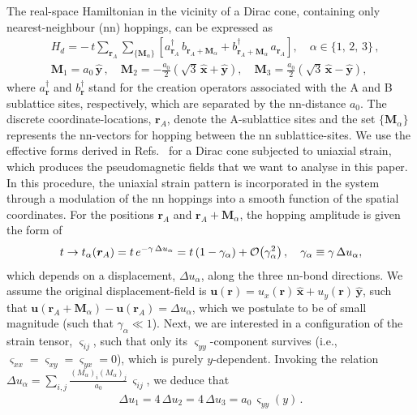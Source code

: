 \documentclass[aps,prb, onecolumn, nofootinbib, citeautoscript,10pt]{revtex4-2}
\newcommand{\bs}[1]{\boldsymbol{#1}}
\def \nn{\nonumber \\}
\begin{document}
The real-space Hamiltonian in the vicinity of a Dirac cone, containing only nearest-neighbour (nn) hoppings, can be expressed as
\begin{align}
\label{eqnn}
& H_d = -\, t \sum_{\bs r_A} \sum \limits_{ \lbrace \bs M_\alpha \rbrace } \left[ 
a_{\bs r_A}^\dagger \, b_{\bs r_A + \bs M_\alpha} + b_{\bs r_A + \bs M_\alpha }^\dagger \, a_{\bs r_A}
\right ], \quad \alpha \in \lbrace 1, \,2 ,\, 3 \rbrace \,,\nn
& \bs M_1 = a_0 \, \bs{\hat y}\,, \quad \bs M_2 = - \frac{a_0}{2} \left(\sqrt 3 \,\bs{\hat x} + \bs{\hat y}\right),
\quad \bs M_3 =  \frac{a_0}{2} \left(\sqrt 3 \,\bs{\hat x} - \bs{\hat y}\right),
\end{align}
where $a^\dagger_{\bs r}$ and $b ^\dagger _{\bs r}$ stand for the creation operators associated with the A and B sublattice sites, respectively, which are separated by the nn-distance $a_0$. The discrete coordinate-locations, $\bs r_A$, denote the A-sublattice sites and the set $\lbrace \bs M_\alpha \rbrace$ represents the nn-vectors for hopping between the nn sublattice-sites. We use the effective forms derived in Refs.~\cite{neto-strain-graphene, strained-dirac-franz} for a Dirac cone subjected to uniaxial strain, which produces the pseudomagnetic fields that we want to analyse in this paper. In this procedure, the uniaxial strain pattern is incorporated in the system through a modulation of the nn hoppings into a  smooth function of the spatial coordinates. For the positions $\bs r_A $ and $\bs r_A + \bs M_\alpha $, the hopping amplitude is given the form of 
\begin{align}
t \rightarrow t_{\alpha}(\bs r_A) 
 = t\, e^{-\gamma \,\Delta u_\alpha }
=  t  \left ( 1 -  \gamma_\alpha \right)
 + \order{ \gamma _\alpha^2 } \,, \quad \gamma_\alpha \equiv \gamma\, \Delta u_\alpha, 
\end{align}
which depends on a displacement, $ \Delta u_{\alpha}$, along the three nn-bond directions. We assume the original displacement-field is $\bs u (\bs r) = u_x (\bs r)  \, \bs {\hat x} + u_y (\bs r) \, \bs {\hat y}$, such that $\bs u ({\bs r_A} + {}\bs M_\alpha) - \bs u (\bs r_A) = \Delta u_\alpha $, which we postulate to be of small magnitude (such that $\gamma_\alpha \ll 1 $).
Next, we are interested in a configuration of the strain tensor, $\varsigma_{ij}$, such that only its $\varsigma_{yy}$-component survives (i.e., $ \varsigma_{xx} = \varsigma_{xy} = \varsigma_{yx} = 0 $), which is purely $y$-dependent. Invoking the relation $\Delta u_{\alpha} = \sum_{i, j} \frac{ \left(M_\alpha \right)_i \left( M_\alpha\right)_j } {a_0}\,\varsigma_{ij}$, we deduce that
\begin{align}
\Delta u_1 = 4\, \Delta u_2 = 4 \, \Delta u_3 = a_0\, \varsigma_{yy}  (y)\,.
\end{align}
\end{document}
